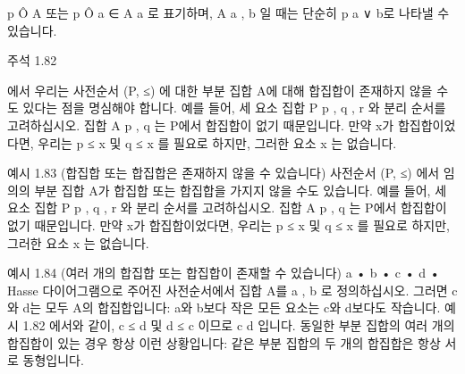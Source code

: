 \documentclass[11pt, a4paper, twoside, openany]{book}
\begin{document}
\par\medskip
p  Ô A 또는 p  Ô
a ∈ A a 로 표기하며, A  { a , b } 일 때는 단순히 p  a ∨ b\hspace{0pt}로 나타낼 수 있습니다.

\par\medskip
주석 1.82

\par\medskip
\begin{definitionbox}[정의 1.81]
\hspace{0pt}에서 우리는 사전순서 (P, ≤) 에 대한 부분 집합 A\hspace{0pt}에 대해 합집합이 존재하지 않을 수도 있다는 점을 명심해야 합니다. 예를 들어, 세 요소 집합 P  { p , q , r } 와 분리 순서를 고려하십시오. 집합 A  { p , q } 는 P\hspace{0pt}에서 합집합이 없기 때문입니다. 만약 x\hspace{0pt}가 합집합이었다면, 우리는 p ≤ x 및 q ≤ x 를 필요로 하지만, 그러한 요소 x 는 없습니다.
\end{definitionbox}

\par\medskip
예시 1.83 (합집합 또는 합집합은 존재하지 않을 수 있습니다)
사전순서 (P, ≤) 에서 임의의 부분 집합 A\hspace{0pt}가 합집합 또는 합집합을 가지지 않을 수도 있습니다. 예를 들어, 세 요소 집합 P  { p , q , r } 와 분리 순서를 고려하십시오. 집합 A  { p , q } 는 P\hspace{0pt}에서 합집합이 없기 때문입니다. 만약 x\hspace{0pt}가 합집합이었다면, 우리는 p ≤ x 및 q ≤ x 를 필요로 하지만, 그러한 요소 x 는 없습니다.

\par\medskip
예시 1.84 (여러 개의 합집합 또는 합집합이 존재할 수 있습니다)
a •
b •
c •
d •
Hasse 다이어그램으로 주어진 사전순서에서 집합 A\hspace{0pt}를 { a , b } 로 정의하십시오. 그러면 c\hspace{0pt}와 d\hspace{0pt}는 모두 A\hspace{0pt}의 합집합입니다: a\hspace{0pt}와 b\hspace{0pt}보다 작은 모든 요소는 c\hspace{0pt}와 d\hspace{0pt}보다도 작습니다. 예시 1.82 에서와 같이, c ≤ d 및 d ≤ c 이므로 c  d 입니다. 동일한 부분 집합의 여러 개의 합집합이 있는 경우 항상 이런 상황입니다: 같은 부분 집합의 두 개의 합집합은 항상 서로 동형입니다.
\end{document}
